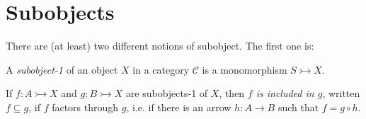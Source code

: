 \documentclass[article, a4paper, 11pt, oneside]{memoir}
\numberwithin{equation}{chapter}
\newcommand{\cat}[1]{\mathcal{#1}}
\newcommand{\catC}{\cat{C}}
\begin{document}




\chapter{Subobjects}

There are (at least) two different notions of subobject. The first one is:

\newcommand{\tomonic}{\rightarrowtail}


\begin{definition}
    A \emph{subobject-1} of an object $X$ in a category $\catC$ is a monomorphism $S \tomonic X$.

    If $f \colon A \tomonic X$ and $g \colon B \tomonic X$ are subobjects-1 of $X$, then \emph{$f$ is included in $g$}, written $f \subseteq g$, if $f$ factors through $g$, i.e. if there is an arrow $h \colon A \to B$ such that $f = g \circ h$.
\end{definition}
\end{document}
